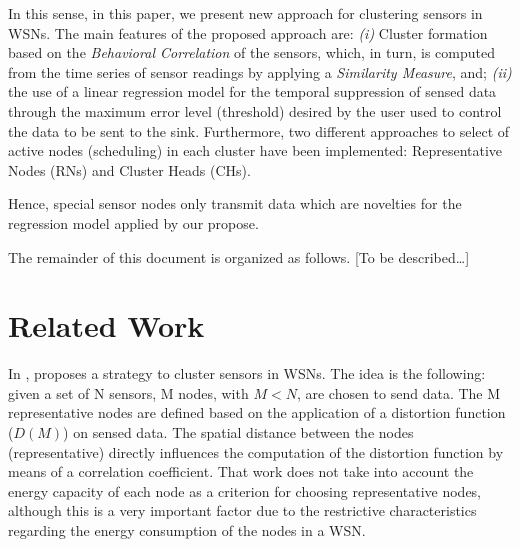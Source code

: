 \documentclass[conference]{IEEEtran}
\begin{document}
In this sense, in this paper, we present new approach for clustering sensors in
WSNs. The main features of the proposed approach are: {\it (i)} Cluster
formation based on the \textit{Behavioral Correlation} of the sensors, which, in
turn, is computed from the time series of sensor readings by applying a
\textit{Similarity Measure}, and; {\it (ii)} the use of a linear regression
model for the temporal suppression of sensed data through the maximum error
level (threshold) desired by the user used to control the data to be sent to the
sink. Furthermore, two different approaches to select of active nodes
(scheduling) in each cluster have been implemented: Representative Nodes (RNs)
and Cluster Heads (CHs).

Hence, special sensor nodes only transmit data which are novelties for the
regression model applied by our propose.



The remainder of this document is organized as follows. [To be described\ldots]


\section{Related Work}

In \cite{Vuran2004}, proposes a strategy to cluster sensors in WSNs. The idea is
the following: given a set of N sensors, M nodes, with $M < N$, are chosen to
send data. The M representative nodes are defined based on the application of a
distortion function ($D(M)$) on sensed data.
The spatial distance between the nodes (representative) directly influences the
computation of the distortion function by means of a correlation coefficient.
That work does not take into account the energy capacity of each node as a
criterion for choosing representative nodes, although this is a very important
factor due to the restrictive characteristics regarding the energy consumption
of the nodes in a WSN.
\end{document}
